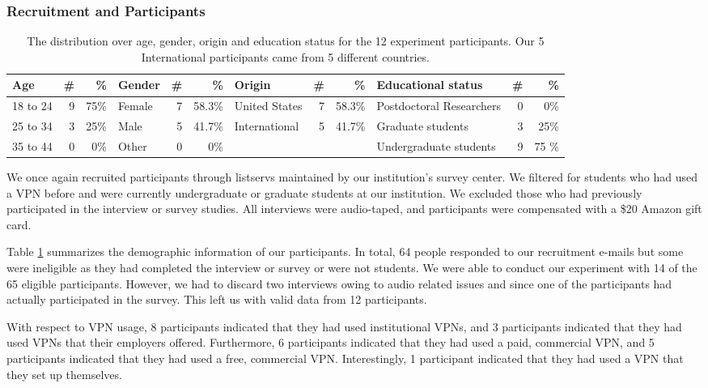 \subsubsection{Recruitment and Participants} 

\begin{table}[h!]
\centering
\begin{tabular}{l r r |l r r|l r r|l r r} 
 \hline
 Age & \# & \% & Gender & \# & \% & Origin & \# & \% & Educational status & \# & \% \\
\hline
18 to 24 & 9 & 75\% & Female & 7 & 58.3\% & United States & 7 & 58.3\% & Postdoctoral Researchers & 0 & 0\% \\
25 to 34 & 3 & 25\% & Male & 5 & 41.7\% & International & 5 & 41.7\% & Graduate students & 3 & 25\% \\
35 to 44 & 0 & 0\% & Other & 0 & 0\% & & & & Undergraduate students & 9 & 75 \% \\
 \hline
\end{tabular}
\caption{The distribution over age, gender, origin and education status for the 12 experiment participants. Our 5 International participants came from 5 different countries.}
\label{tab:experiment_demo}
\end{table}

We once again recruited participants through listservs maintained by our
institution's survey center. We filtered for students who had used a VPN
before and were
currently undergraduate or graduate students at our institution. We excluded those who had previously participated in the interview or survey studies. All
interviews were audio-taped, and participants were compensated with a \$20
Amazon gift card.

Table \ref{tab:experiment_demo} summarizes the demographic information of our participants. In total, 64 people responded to our recruitment e-mails but some were
ineligible as they had completed the interview or survey or were not students.
We were able to conduct our experiment with 14 of the 65 eligible
participants.  However, we had to discard two interviews owing to audio
related issues and since one of the participants had actually participated in
the survey.  This left us with valid data from 12 participants.

With respect to VPN usage, 8 participants indicated that they had used institutional VPNs, and 3 participants indicated that they had used VPNs that their employers offered.
Furthermore, 6 participants indicated that they had used a paid, commercial VPN, and 5 participants indicated that they had used a free, commercial VPN.
Interestingly, 1 participant indicated that they had used a VPN that they set up themselves.

